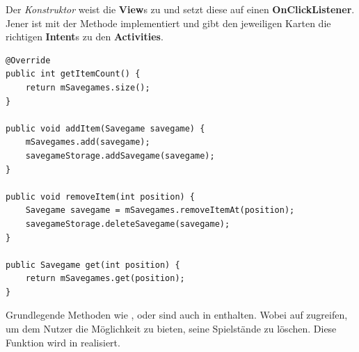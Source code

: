 Der \emph{Konstruktor} weist die \textbf{View}s zu und setzt diese auf einen
\textbf{OnClickListener}. Jener ist mit der Methode 
implementiert und gibt den jeweiligen Karten die richtigen \textbf{Intent}s zu
den \textbf{Activities}.\\

\begin{lstlisting}[caption={SavegameAdapter Grundlegende Methoden},captionpos=b]
@Override
public int getItemCount() {
	return mSavegames.size();
}

public void addItem(Savegame savegame) {
	mSavegames.add(savegame);
	savegameStorage.addSavegame(savegame);
}

public void removeItem(int position) {
	Savegame savegame = mSavegames.removeItemAt(position);
	savegameStorage.deleteSavegame(savegame);
}

public Savegame get(int position) {
	return mSavegames.get(position);
}
\end{lstlisting}

Grundlegende Methoden wie ,
 oder  sind auch in
 enthalten. Wobei  auf
 zugreifen, um dem Nutzer die Möglichkeit zu bieten,
seine Spielstände zu löschen. Diese Funktion wird in 
realisiert.
